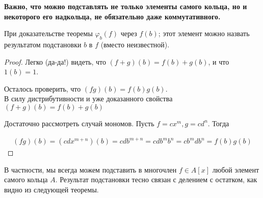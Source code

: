 \begin{normalsize}
    \textbf{Важно, что можно подставлять не только элементы самого кольца,
    но и некоторого его надкольца, не обязательно даже коммутативного.}


    При доказательстве теоремы $\varphi_b(f)$ через $f(b)$; этот элемент можно назвать результатом подстановки $b$ в $f$ (вместо неизвестной).
    
    \begin{proof}
        Легко (да-да!) видеть, что $(f+g)(b) = f(b) + g(b)$, и что $1(b) = 1$.
        
        Осталось проверить, что $(fg)(b) = f(b)g(b)$. \\
        В силу дистрибутивности и уже доказанного свойства $(f + g)(b) = f(b) + g(b)$

        Достаточно рассмотреть случай мономов. Пусть $f = cx^m, g = cd^n$. Тогда
        
        \begin{align*}
            (fg)(b) = (cdx^{m+n})(b) = cdb^{m+n} = cdb^mb^n = cb^mdb^n = f(b)g(b)
        \end{align*}
    \end{proof}

    В частности, мы всегда можем подставить в многочлен $f \in A[x]$
    любой элемент самого кольца $A$. Результат подстановки тесно связан с делением с остатком, 
    как видно из следующей теоремы.






















\end{normalsize}
